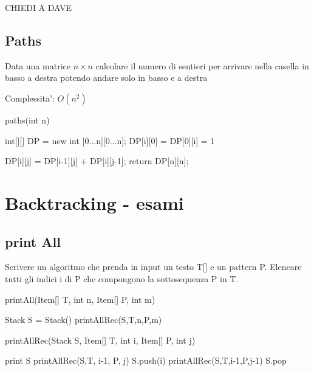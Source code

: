 \documentclass[oneside]{book}
\begin{document}
CHIEDI A DAVE


\newpage
\section{Paths}
Data una matrice $n{\times}n$ calcolare il numero di sentieri per arrivare nella casella in basso a destra potendo andare solo in basso e a destra

Complessita': $O(n^2)$

\begin{algorithm}
\caption{paths(int n)\label{alg:cap}}
\begin{algorithmic}
\State int[][] DP = new int [0...n][0...n];
	\State DP[i][0] = DP[0][i] = 1
\EndFor

		\State DP[i][j] = DP[i-1][j] + DP[i][j-1];
	\EndFor
\EndFor
return DP[n][n];
\end{algorithmic}
\end{algorithm}


\chapter{Backtracking - esami}

\section{print All}
Scrivere un algoritmo che prenda in input un testo T[] e un pattern P. Elencare tutti gli indici i di P che compongono la sottosequenza P in T.

\begin{algorithm}
\caption{printAll(Item[] T, int n, Item[] P, int m)\label{alg:cap}}
\begin{algorithmic}
\State Stack S = Stack()
\State printAllRec(S,T,n,P,m)
\end{algorithmic}
\end{algorithm}


\begin{algorithm}
\caption{printAllRec(Stack S, Item[] T, int i, Item[] P, int j)\label{alg:cap}}
\begin{algorithmic}
	print S
	\State printAllRec(S,T, i-1, P, j)
		\State S.push(i)
		\State printAllRec(S,T,i-1,P,j-1)
		\State S.pop
	\EndIf
\EndIf
\end{algorithmic}
\end{algorithm}
\end{document}
